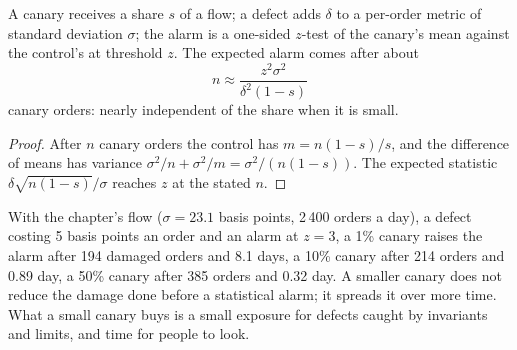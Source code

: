\begin{proposition}\label{prop:rs:live-experiments:canary}
A canary receives a share $s$ of a flow; a defect adds $\delta$ to a per-order metric of standard deviation $\sigma$; the alarm is a one-sided $z$-test of the
canary's mean against the control's at threshold $z$. The expected alarm comes after about
\[
n \approx \frac{z^2\sigma^2}{\delta^2(1 - s)}
\]
canary orders: nearly independent of the share when it is small.
\end{proposition}

\begin{proof}
After $n$ canary orders the control has $m = n(1-s)/s$, and the difference of means has variance $\sigma^2/n + \sigma^2/m = \sigma^2/(n(1-s))$. The expected
statistic $\delta\sqrt{n(1-s)}/\sigma$ reaches $z$ at the stated $n$.
\end{proof}

With the chapter's flow ($\sigma = 23.1$ basis points, 2\,400 orders a day), a defect costing 5 basis points an order and an alarm at $z = 3$, a 1\% canary
raises the alarm after 194 damaged orders and 8.1 days, a 10\% canary after 214 orders and 0.89 day, a 50\% canary after 385 orders and 0.32 day. A smaller
canary does not reduce the damage done before a statistical alarm; it spreads it over more time. What a small canary buys is a small exposure for defects
caught by invariants and limits, and time for people to look.

